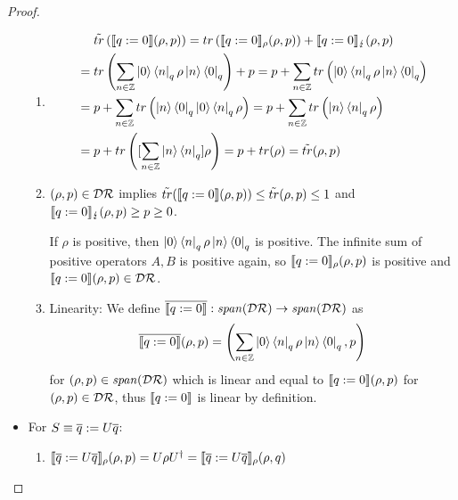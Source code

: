 \documentclass[a4paper,UKenglish,cleveref, autoref, thm-restate]{lipics-v2021}
\begin{document}
\begin{proof}
\begin{itemize}
\begin{enumerate}
            \item
            \begin{align*}
                &\phantom{=.}\tilde{tr}\left(\llbracket q:=0 \rrbracket(\rho,p)\right) = tr\left(\llbracket  q:=0  \rrbracket_{\rho} (\rho ,p)\right) +\llbracket  q:=0  \rrbracket_{\lightning} (\rho ,p)\\
                &=tr\left(\sum_{n\in \mathbb{Z}} \ket{0} \bra{n}_q \rho \ket{n} \bra{0}_q\right) + p= p+ \sum_{n\in \mathbb{Z}} tr\left(\ket{0} \bra{n} _q \rho \ket{n} \bra{0}_q\right)\\
                &=p+ \sum_{n\in \mathbb{Z}} tr\left(\ket{n} \bra{0}_q \ket{0} \bra{n} _q \rho \right) = p+ \sum_{n\in \mathbb{Z}} tr\left(\ket{n}\bra{n}_q \rho \right)\\
                &= p+ tr\left([\sum_{n\in \mathbb{Z}} \ket{n}\bra{n}_q ]\rho \right)= p+tr(\rho) = \tilde{tr}(\rho,p)
            \end{align*}

            \item
             $(\rho,p) \in \mathcal{D}\mathcal{R}$ implies $\tilde{tr}(\llbracket q:=0 \rrbracket(\rho,p))\leq \tilde{tr}(\rho,p)\leq 1$ and $ \llbracket q:=0 \rrbracket_{\lightning}(\rho,p) \geq p \geq 0$.

            If $\rho$ is positive, then $\ket{0} \bra{n}_q \rho \ket{n} \bra{0}_q$ is positive. The infinite sum of positive operators $A,B$ is positive again,
            so $\llbracket q:=0 \rrbracket_{\rho}(\rho,p)$ is positive and $\llbracket q:=0 \rrbracket(\rho,p) \in \mathcal{D}\mathcal{R}$.

            \item Linearity:
            We define $\overline{\llbracket q:=0 \rrbracket}: \mathit{span}(\mathcal{D}\mathcal{R}) \to \mathit{span}(\mathcal{D}\mathcal{R})$ as
            \begin{align*}
                 \overline{\llbracket q:=0 \rrbracket}(\rho,p) =\left(\sum_{n\in \mathbb{Z}} \ket{0} \bra{n}_q \rho \ket{n} \bra{0}_q, p\right)
            \end{align*} for $(\rho,p) \in \mathit{span}(\mathcal{D}\mathcal{R})$ which is linear and equal to $\llbracket q:=0 \rrbracket(\rho,p)$ for $(\rho,p) \in \mathcal{D}\mathcal{R}$, thus $\llbracket q:=0 \rrbracket$ is linear by definition.
\end{enumerate}
        \item For $S \equiv \overline{q}:= U\overline{q}$:
        \begin{enumerate}
            \item $\llbracket \overline{q}:= U\overline{q} \rrbracket_{\rho}(\rho,p) =U \rho U^\dagger = \llbracket \overline{q}:= U\overline{q} \rrbracket_{\rho}(\rho,q)$


\end{enumerate}
\end{itemize}
\end{proof}
\end{document}
